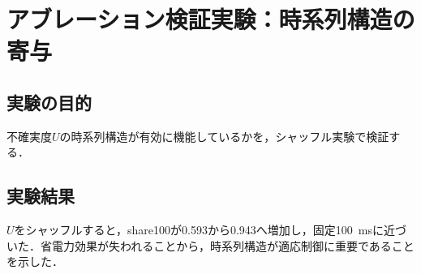 \section{アブレーション検証実験：時系列構造の寄与}
\label{sec:exp_ablation_shuffle}

\subsection{実験の目的}

不確実度$U$の時系列構造が有効に機能しているかを，シャッフル実験で検証する．

\subsection{実験結果}

$U$をシャッフルすると，share100が0.593から0.943へ増加し，固定\SI{100}{\milli\second}に近づいた．省電力効果が失われることから，時系列構造が適応制御に重要であることを示した．

\clearpage
